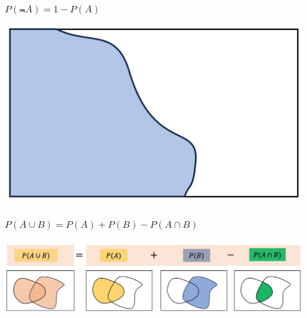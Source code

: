 \documentclass[compress]{beamer}
\begin{document}
\begin{frame}\frametitle{$P(\Not{A})=1-P(A)$}
\begin{center}
\includegraphics[scale=.26]{figs/A_complement.png} 
\end{center}
\vspace{1in}
\end{frame}


\begin{frame}\frametitle{$P(A\cup B)= P(A)+P(B)-P(A\cap B)$}
\includegraphics[scale=.26]{figs/P_A_UNION_B.png} 
\vspace{1in}
\end{frame}
\end{document}
